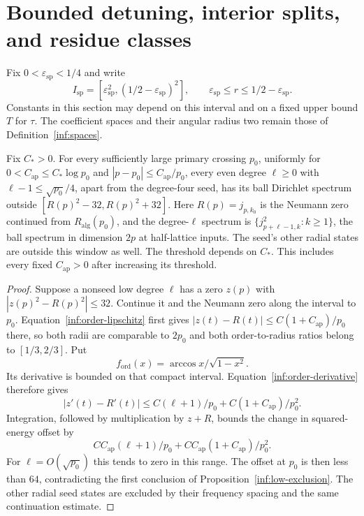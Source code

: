 \section{Bounded detuning, interior splits, and residue classes}
\label{inf:sec-widened}

Fix $0<\varepsilon_{\mathrm{sp}}<1/4$ and write
\[
 I_{\mathrm{sp}}=[\varepsilon_{\mathrm{sp}}^2,
                         (1/2-\varepsilon_{\mathrm{sp}})^2],\qquad
 \varepsilon_{\mathrm{sp}}\le r\le1/2-\varepsilon_{\mathrm{sp}}.
\]
Constants in this section may depend on this interval and on a fixed
upper bound $T$ for $\tau$. The coefficient spaces and their angular
radius two remain those of Definition~\ref{inf:spaces}.

\begin{lemma}
\label{inf:wide-low-transfer}
Fix $C_*>0$. For every sufficiently large primary crossing $p_0$,
uniformly for $0<C_{\mathrm{ap}}\le C_*\log p_0$ and
$|p-p_0|\le C_{\mathrm{ap}}/p_0$, every even degree $\ell\ge0$
with $\ell-1\le\sqrt{p_0}/4$, apart from the degree-four seed,
has its ball Dirichlet spectrum outside $[R(p)^2-32,R(p)^2+32]$.
Here $R(p)=j_{p,k_0}$ is the Neumann zero continued from
$R_{\mathrm{alg}}(p_0)$, and the degree-$\ell$ spectrum is
$\{j_{p+\ell-1,k}^2:k\ge1\}$, the ball spectrum in dimension $2p$
at half-lattice inputs.
The seed's other radial states are outside this window as well.
The threshold depends on $C_*$. This includes every fixed
$C_{\mathrm{ap}}>0$ after increasing its threshold.
\end{lemma}
\begin{proof}
Suppose a nonseed low degree $\ell$ has a zero $z(p)$ with
$|z(p)^2-R(p)^2|\le32$. Continue it and the Neumann zero along the
interval to $p_0$. Equation~\eqref{inf:order-lipschitz} first gives
$|z(t)-R(t)|\le C(1+C_{\mathrm{ap}})/p_0$ there, so both radii are
comparable to $2p_0$ and both order-to-radius ratios belong to
$[1/3,2/3]$. Put
\[
 f_{\mathrm{ord}}(x)=\arccos x/\sqrt{1-x^2}.
\]
Its derivative is bounded on that compact interval.
Equation~\eqref{inf:order-derivative} therefore gives
\[
 |z'(t)-R'(t)|\le C(\ell+1)/p_0
                         +C(1+C_{\mathrm{ap}})/p_0^2.
\]
Integration, followed by multiplication by $z+R$, bounds the change
in squared-energy offset by
\begin{equation}\label{inf:wide-low-error}
 C C_{\mathrm{ap}}(\ell+1)/p_0
       +C C_{\mathrm{ap}}(1+C_{\mathrm{ap}})/p_0^2.
\end{equation}
For $\ell=O(\sqrt{p_0})$ this tends to zero in this range.
The offset at $p_0$ is then less than $64$, contradicting the first
conclusion of Proposition~\ref{inf:low-exclusion}. The other radial
seed states are excluded by their frequency spacing and the same
continuation estimate.
\end{proof}

